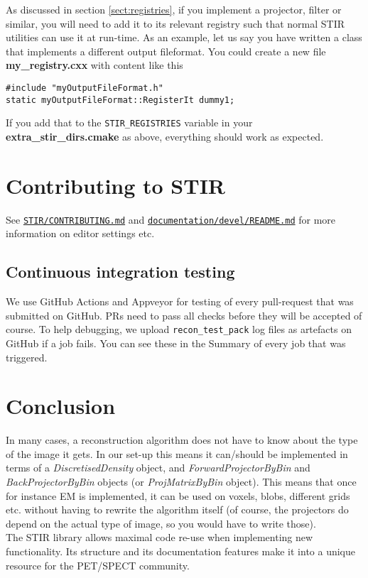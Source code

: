 \documentclass{article}
\def\R2Lurl#1#2{\mbox{\href{#1}{\tt #2}}}
\begin{document}
As discussed in section \ref{sect:registries}, if you implement a projector, filter
or similar, you will need to add it to its relevant registry
such that normal STIR utilities can use it at run-time.
As an example, let us say you have written a class that implements
a different output fileformat. You could create a new file \textbf{my\_registry.cxx} with
content like this
\begin{verbatim}
#include "myOutputFileFormat.h"
static myOutputFileFormat::RegisterIt dummy1;
\end{verbatim}
If you add that to the \texttt{STIR\_REGISTRIES} variable in your \textbf{extra\_stir\_dirs.cmake}
as above, everything should work as expected.

\section{Contributing to STIR}
See
\R2Lurl{https://github.com/UCL/STIR/blob/master/CONTRIBUTING.md}{STIR/CONTRIBUTING.md}
and
\R2Lurl{https://github.com/UCL/STIR/blob/master/documentation/devel/README.md}{documentation/devel/README.md}
for more information on editor settings etc.

\subsection{Continuous integration testing}
We use GitHub Actions and Appveyor for testing of every pull-request that was submitted on GitHub. PRs
need to pass all checks before they will be accepted of course.
To help debugging, we upload \texttt{recon\_test\_pack} log files as artefacts on
GitHub if a job fails. You can see these in the Summary of every job that was triggered.

\section{
Conclusion}

In many cases, a reconstruction algorithm does not have to know 
about the type of the image it gets. In our set-up this means 
it can/should be implemented in terms of a \textit{DiscretisedDensity} 
object, and \textit{ForwardProjectorByBin} and \textit{BackProjectorByBin} 
objects (or \textit{ProjMatrixByBin} object). This means that once 
for instance EM is implemented, it can be used on voxels, blobs, 
different grids etc. without having to rewrite the algorithm 
itself (of course, the projectors do depend on the actual type 
of image, so you would have to write those).\\
The STIR library allows maximal code re-use when implementing 
new functionality. Its structure and its documentation features 
make it into a unique resource for the PET/SPECT community. 
\end{document}
